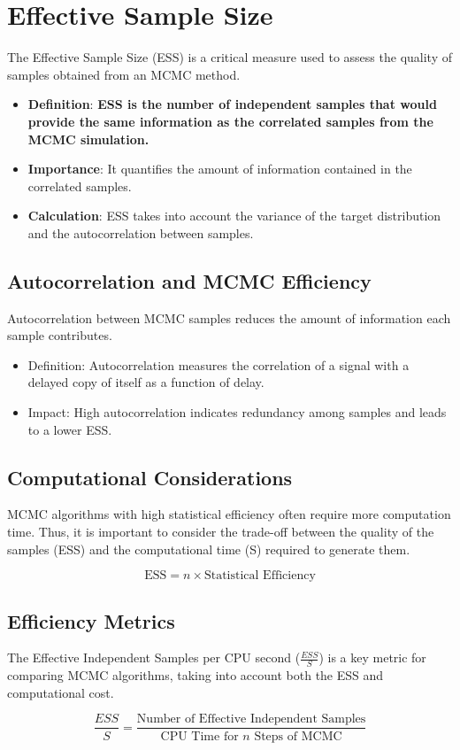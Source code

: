 \documentclass{article}
\begin{document}
\section{Effective Sample Size}
The Effective Sample Size (ESS) is a critical measure used to assess the quality of samples obtained from an MCMC method.

\begin{itemize}
    \item \textbf{Definition}: \textbf{ESS is the number of independent samples that would provide the same information as the correlated samples from the MCMC simulation.}
    \item \textbf{Importance}: It quantifies the amount of information contained in the correlated samples.
    \item \textbf{Calculation}: ESS takes into account the variance of the target distribution and the autocorrelation between samples.
\end{itemize}

\subsection{Autocorrelation and MCMC Efficiency}
Autocorrelation between MCMC samples reduces the amount of information each sample contributes. 

\begin{itemize}
    \item Definition: Autocorrelation measures the correlation of a signal with a delayed copy of itself as a function of delay.
    \item Impact: High autocorrelation indicates redundancy among samples and leads to a lower ESS.
\end{itemize}

\subsection{Computational Considerations}
MCMC algorithms with high statistical efficiency often require more computation time. Thus, it is important to consider the trade-off between the quality of the samples (ESS) and the computational time (S) required to generate them.

\begin{equation}
    \text{ESS} = n \times \text{Statistical Efficiency}
\end{equation}

\subsection{Efficiency Metrics}
The Effective Independent Samples per CPU second (\( \frac{ESS}{S} \)) is a key metric for comparing MCMC algorithms, taking into account both the ESS and computational cost.

\begin{equation}
    \frac{ESS}{S} = \frac{\text{Number of Effective Independent Samples}}{\text{CPU Time for } n \text{ Steps of MCMC}}
\end{equation}
\end{document}
